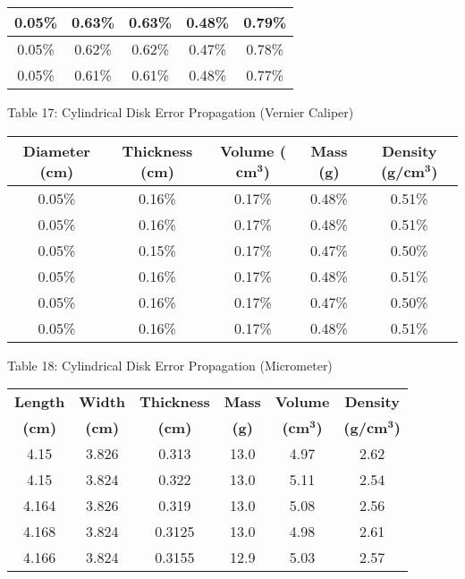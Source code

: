 \begin{center}
\begin{center}
\begin{tabular}{|c|c|c|c|c|}
        0.05\% & 0.63\% & 0.63\% & 0.48\% & 0.79\% \\ \hline
        0.05\% & 0.62\% & 0.62\% & 0.47\% & 0.78\% \\ \hline
        0.05\% & 0.61\% & 0.61\% & 0.48\% & 0.77\% \\ \hline
    \end{tabular}
\end{center}
Table 17: Cylindrical Disk Error Propagation (Vernier Caliper)
\begin{center}
    \begin{tabular}{|c|c|c|c|c|}
        \hline
        \textbf{Diameter (cm)} & \textbf{Thickness (cm)} & \textbf{Volume ($\bm{\textbf{cm}^3}$)} & \textbf{Mass (g)} & \textbf{Density (g/$\bm{\textbf{cm}^3}$)}  \\
        \hline
        0.05\% & 0.16\% & 0.17\% & 0.48\% & 0.51\% \\ \hline
        0.05\% & 0.16\% & 0.17\% & 0.48\% & 0.51\% \\ \hline
        0.05\% & 0.15\% & 0.17\% & 0.47\% & 0.50\% \\ \hline
        0.05\% & 0.16\% & 0.17\% & 0.48\% & 0.51\% \\ \hline
        0.05\% & 0.16\% & 0.17\% & 0.47\% & 0.50\% \\ \hline
        0.05\% & 0.16\% & 0.17\% & 0.48\% & 0.51\% \\ \hline
    \end{tabular}
\end{center}
Table 18: Cylindrical Disk Error Propagation (Micrometer)
\begin{center}
    \begin{tabular}{|c|c|c|c|c|c|}
        \hline
        \textbf{Length} & \textbf{Width} & \textbf{Thickness} & \textbf{Mass} & \textbf{Volume} & \textbf{Density}\\
        \textbf{(cm)} & \textbf{(cm)} & \textbf{(cm)} & \textbf{(g)} & \textbf{($\bm{\textbf{cm}^3}$)} & \textbf{(g/$\bm{\textbf{cm}^3}$)}\\
        \hline
        4.15 & 3.826 & 0.313 & 13.0 & 4.97 & 2.62\\ \hline
        4.15 & 3.824 & 0.322 & 13.0 & 5.11 & 2.54\\ \hline
        4.164 & 3.826 & 0.319 & 13.0 & 5.08 & 2.56\\ \hline
        4.168 & 3.824 & 0.3125 & 13.0 & 4.98 & 2.61\\ \hline
        4.166 & 3.824 & 0.3155 & 12.9 & 5.03 & 2.57\\ \hline

\end{tabular}
\end{center}
\end{center}
